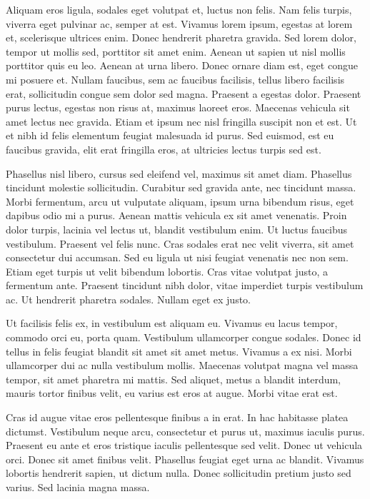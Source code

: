 \documentclass[a4paper, 11pt, titlepage, twocolumn]{article}
\begin{document}
Aliquam eros ligula, sodales eget volutpat et, luctus non felis. Nam felis turpis, viverra eget pulvinar ac, semper at est. Vivamus lorem ipsum, egestas at lorem et, scelerisque ultrices enim. Donec hendrerit pharetra gravida. Sed lorem dolor, tempor ut mollis sed, porttitor sit amet enim. Aenean ut sapien ut nisl mollis porttitor quis eu leo. Aenean at urna libero. Donec ornare diam est, eget congue mi posuere et. Nullam faucibus, sem ac faucibus facilisis, tellus libero facilisis erat, sollicitudin congue sem dolor sed magna. Praesent a egestas dolor. Praesent purus lectus, egestas non risus at, maximus laoreet eros. Maecenas vehicula sit amet lectus nec gravida. Etiam et ipsum nec nisl fringilla suscipit non et est. Ut et nibh id felis elementum feugiat malesuada id purus. Sed euismod, est eu faucibus gravida, elit erat fringilla eros, at ultricies lectus turpis sed est.

Phasellus nisl libero, cursus sed eleifend vel, maximus sit amet diam. Phasellus tincidunt molestie sollicitudin. Curabitur sed gravida ante, nec tincidunt massa. Morbi fermentum, arcu ut vulputate aliquam, ipsum urna bibendum risus, eget dapibus odio mi a purus. Aenean mattis vehicula ex sit amet venenatis. Proin dolor turpis, lacinia vel lectus ut, blandit vestibulum enim. Ut luctus faucibus vestibulum. Praesent vel felis nunc. Cras sodales erat nec velit viverra, sit amet consectetur dui accumsan. Sed eu ligula ut nisi feugiat venenatis nec non sem. Etiam eget turpis ut velit bibendum lobortis. Cras vitae volutpat justo, a fermentum ante. Praesent tincidunt nibh dolor, vitae imperdiet turpis vestibulum ac. Ut hendrerit pharetra sodales. Nullam eget ex justo.

Ut facilisis felis ex, in vestibulum est aliquam eu. Vivamus eu lacus tempor, commodo orci eu, porta quam. Vestibulum ullamcorper congue sodales. Donec id tellus in felis feugiat blandit sit amet sit amet metus. Vivamus a ex nisi. Morbi ullamcorper dui ac nulla vestibulum mollis. Maecenas volutpat magna vel massa tempor, sit amet pharetra mi mattis. Sed aliquet, metus a blandit interdum, mauris tortor finibus velit, eu varius est eros at augue. Morbi vitae erat est.

Cras id augue vitae eros pellentesque finibus a in erat. In hac habitasse platea dictumst. Vestibulum neque arcu, consectetur et purus ut, maximus iaculis purus. Praesent eu ante et eros tristique iaculis pellentesque sed velit. Donec ut vehicula orci. Donec sit amet finibus velit. Phasellus feugiat eget urna ac blandit. Vivamus lobortis hendrerit sapien, ut dictum nulla. Donec sollicitudin pretium justo sed varius. Sed lacinia magna massa.
\end{document}
